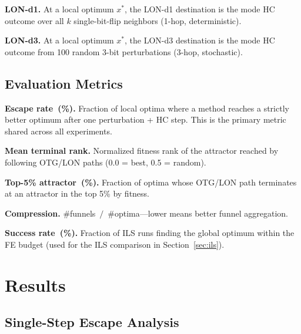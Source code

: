 \documentclass[runningheads]{llncs}
\begin{document}
\textbf{LON-d1.}
At a local optimum $x^*$, the LON-d1 destination is the mode HC outcome over all $k$ single-bit-flip neighbors (1-hop, deterministic).

\textbf{LON-d3.}
At a local optimum $x^*$, the LON-d3 destination is the mode HC outcome from 100 random 3-bit perturbations (3-hop, stochastic).

\subsection{Evaluation Metrics}
\label{sec:metrics}

\textbf{Escape rate~(\%).}
Fraction of local optima where a method reaches a strictly better optimum after one perturbation + HC step.
This is the primary metric shared across all experiments.

\textbf{Mean terminal rank.}
Normalized fitness rank of the attractor reached by following OTG/LON paths (0.0 = best, 0.5 = random).

\textbf{Top-5\% attractor~(\%).}
Fraction of optima whose OTG/LON path terminates at an attractor in the top 5\% by fitness.

\textbf{Compression.}
$\#$funnels~$/$~$\#$optima---lower means better funnel aggregation.

\textbf{Success rate~(\%).}
Fraction of ILS runs finding the global optimum within the FE budget (used for the ILS comparison in Section~\ref{sec:ils}).


\section{Results}
\label{sec:results}

\subsection{Single-Step Escape Analysis}
\label{sec:escape}
\end{document}
